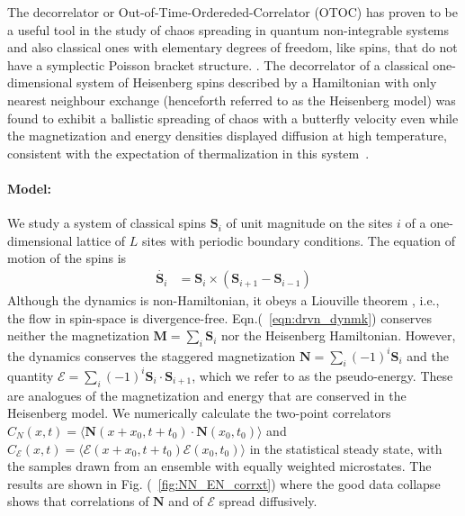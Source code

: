 \documentclass[prl,aps,twocolumn,nosuperscriptaddress,bibnotes,notitlepage,nofootinbib]{revtex4-2}
\newcommand{\magg}{\mathbf{M}}
\newcommand{\stagg}{\mathbf{N}}
\newcommand{\spin}{\mathbf{S}}
\begin{document}
The decorrelator or Out-of-Time-Ordereded-Correlator (OTOC) has proven to be a useful tool in the study of chaos spreading in quantum non-integrable systems and also classical ones with elementary degrees of freedom, like spins, that do not have a symplectic Poisson bracket structure.   \cite{PhysRevB.105.214308,PhysRevX.8.031057,1503.01409}. The decorrelator of a classical one-dimensional system of Heisenberg spins described by a Hamiltonian with only nearest neighbour exchange (henceforth referred to as the Heisenberg model) was found to exhibit a ballistic spreading of chaos with a butterfly velocity even while the magnetization and energy densities displayed diffusion at high temperature, consistent with the expectation of thermalization in this system~\cite{das2018light,McRoberts_PRB105}.

\paragraph{Model:} We study a system of classical spins ${\spin}_i$ of unit magnitude on the sites $i$ of a one-dimensional lattice of $L$ sites with periodic boundary conditions. The equation of motion of the spins is 
\begin{align}
\dot{\spin_i} &= \spin_i \times (\spin_{i+1} - \spin_{i-1} )
\label{eqn:drvn_dynmk}
\end{align}
Although the dynamics is non-Hamiltonian, it  obeys a Liouville theorem \cite{Suppinf}, i.e., the flow in spin-space is divergence-free.
Eqn.(~\ref{eqn:drvn_dynmk}) conserves neither the magnetization ${\magg}=\sum_i {\spin}_i$ nor the Heisenberg Hamiltonian.
However, the dynamics conserves the staggered magnetization ${\stagg}=\sum_i (-1)^i {\spin}_i$ and the quantity 
$%
\mathcal{E}= \sum_i (-1)^i {\spin}_i \cdot {\spin}_{i+1}$, which we refer to as the pseudo-energy. These are analogues of the magnetization and energy that are conserved in the Heisenberg model.
We numerically calculate the two-point correlators $C_N(x,t) = \langle {\stagg}(x+x_0,t+t_0) \cdot {\stagg}(x_0,t_0)\rangle$ and $C_{{\mathcal E}}(x,t) = \langle {\mathcal E}(x+x_0,t+t_0){\mathcal E} (x_0,t_0)\rangle$ in the statistical steady state, with the samples drawn from an ensemble with equally weighted microstates. 
The results are shown in Fig. (~\ref{fig:NN_EN_corrxt}) where the good data collapse shows that correlations of ${\stagg}$ and of ${\mathcal E}$ spread diffusively.
 
\end{document}

